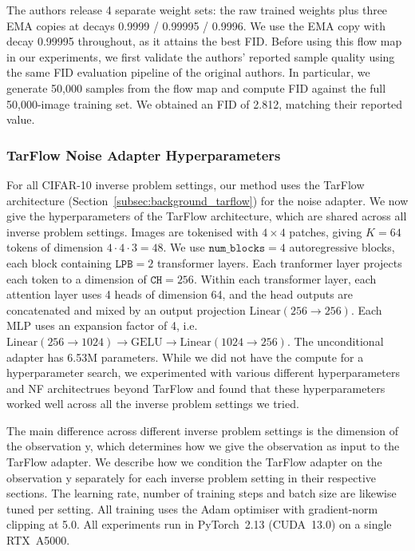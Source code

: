 \documentclass[12pt,a4paper]{report}
\begin{document}
The authors release 4 separate weight sets: the raw trained weights plus three EMA copies at decays 0.9999 / 0.99995 / 0.9996. We use the EMA copy with decay 0.99995 throughout, as it attains the best FID.
Before using this flow map in our experiments, we first validate the authors' reported sample quality using the same FID evaluation pipeline of the original authors. 
In particular, we generate 50,000 samples from the flow map and compute FID against the full 50,000-image training set. 
We obtained an FID of 2.812, matching their reported value. 

\subsubsection{TarFlow Noise Adapter Hyperparameters}
For all CIFAR-10 inverse problem settings, our method uses the TarFlow architecture (Section~\ref{subsec:background_tarflow}) for the noise adapter. 
We now give the hyperparameters of the TarFlow architecture, which are shared across all inverse problem settings.
Images are tokenised with $4 \times 4$ patches, giving $K = 64$ tokens of dimension $4 \cdot 4 \cdot 3 = 48$. 
We use $\texttt{num\_blocks} = 4$ autoregressive blocks, each block containing $\texttt{LPB} = 2$
transformer layers. 
Each tranformer layer projects each token to a dimension of $\texttt{CH} = 256$. 
Within each transformer layer, each attention layer uses 4 heads of dimension 64, and the head outputs are concatenated
and mixed by an output projection $\text{Linear}(256 \to 256)$. 
Each MLP uses an expansion factor of 4, i.e.\ $\text{Linear}(256 \to 1024) \to \text{GELU} \to \text{Linear}(1024 \to 256)$. 
The unconditional adapter has 6.53M parameters.
While we did not have the compute for a hyperparameter search, we experimented with various different hyperparameters and NF architectrues beyond TarFlow and found that these hyperparameters worked well across all the inverse problem settings we tried. 

The main difference across different inverse problem settings is the dimension of the observation y, which determines how we give the observation as input to the TarFlow adapter.
We describe how we condition the TarFlow adapter on the observation y separately for each inverse problem setting in their respective sections.
The learning rate, number of training steps and batch size are likewise tuned per setting. 
All training uses the Adam optimiser with gradient-norm clipping at 5.0. 
All experiments run in PyTorch~2.13 (CUDA~13.0) on a single RTX~A5000. 
\end{document}
